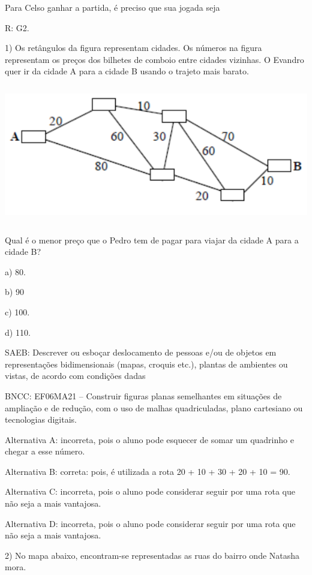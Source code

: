 Para Celso ganhar a partida, é preciso que sua jogada seja

R: G2.


1) Os retângulos da figura representam cidades. Os números na figura
representam os preços dos bilhetes de comboio entre cidades vizinhas. O
Evandro quer ir da cidade A para a cidade B usando o trajeto mais
barato.

\includegraphics[width=5.90625in,height=2.38542in]{./imgSAEB_6_MAT/media/image74.png}

Qual é o menor preço que o Pedro tem de pagar para viajar da cidade A
para a cidade B?

a) 80.

b) 90

c) 100.

d) 110.

SAEB: Descrever ou esboçar deslocamento de pessoas e/ou de objetos em
representações bidimensionais (mapas, croquis etc.), plantas de
ambientes ou vistas, de acordo com condições dadas

BNCC: EF06MA21 -- Construir figuras planas semelhantes em situações de
ampliação e de redução, com o uso de malhas quadriculadas, plano
cartesiano ou tecnologias digitais.

Alternativa A: incorreta, pois o aluno pode esquecer de somar um
quadrinho e chegar a esse número.

Alternativa B: correta: pois, é utilizada a rota 20 + 10 + 30 + 20 + 10
= 90.

Alternativa C: incorreta, pois o aluno pode considerar seguir por uma
rota que não seja a mais vantajosa.

Alternativa D: incorreta, pois o aluno pode considerar seguir por uma
rota que não seja a mais vantajosa.

2) No mapa abaixo, encontram-se representadas as ruas do bairro onde
Natasha mora.

